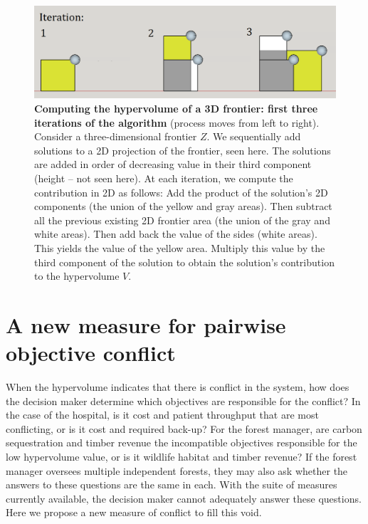 \begin{figure}[ht]
\centering
\caption[First three iterations for computing the sub-dimensional hypervolume $\overbar{V}$]{\textbf{Computing the hypervolume of a 3D frontier: first three iterations of the algorithm} (process moves from left to right). Consider a three-dimensional frontier $Z$. We sequentially add solutions to a 2D projection of the frontier, seen here. The solutions are added in order of decreasing value in their third component (height -- not seen here). At each iteration, we compute the contribution in 2D as follows: Add the product of the solution's 2D components (the union of the yellow and gray areas). Then subtract all the previous existing 2D frontier area (the union of the gray and white areas). Then add back the value of the sides (white areas). This yields the value of the yellow area. Multiply this value by the third component of the solution to obtain the solution's contribution to the hypervolume $V$.}
\label{fig:AlgoAid}
\includegraphics[width=.85\textwidth]{../images/3DFrontierSchematic_SketchUp_FirstSteps_2D_clean}
\end{figure}

\section{A new measure for pairwise objective conflict}
\label{sec:newConflictMetric}
When the hypervolume indicates that there is conflict in the system, how does the decision maker determine which objectives are responsible for the conflict? In the case of the hospital, is it cost and patient throughput that are most conflicting, or is it cost and required back-up? For the forest manager, are carbon sequestration and timber revenue the incompatible objectives responsible for the low hypervolume value, or is it wildlife habitat and timber revenue? If the forest manager oversees multiple independent forests, they may also ask whether the answers to these questions are the same in each. With the suite of measures currently available, the decision maker cannot adequately answer these questions. Here we propose a new measure of conflict to fill this void.

